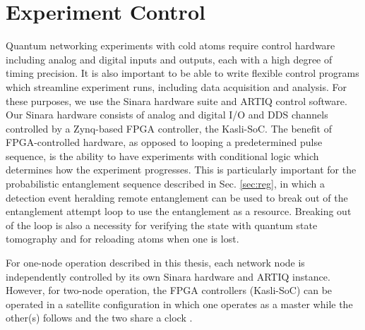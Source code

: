 \section{Experiment Control}

Quantum networking experiments with cold atoms require control hardware including analog and digital inputs and outputs, each with a high degree of timing precision. It is also important to be able to write flexible control programs which streamline experiment runs, including data acquisition and analysis. For these purposes, we use the Sinara hardware suite and ARTIQ control software. Our Sinara hardware consists of analog and digital I/O and DDS channels controlled by a Zynq-based FPGA controller, the Kasli-SoC\cite{lam2021combining}. The benefit of FPGA-controlled hardware, as opposed to looping a predetermined pulse sequence, is the ability to have experiments with conditional logic which determines how the experiment progresses. This is particularly important for the probabilistic entanglement sequence described in Sec. \ref{sec:reg}, in which a detection event heralding remote entanglement can be used to break out of the entanglement attempt loop to use the entanglement as a resource. Breaking out of the loop is also a necessity for verifying the state with quantum state tomography and for reloading atoms when one is lost.

For one-node operation described in this thesis, each network node is independently controlled by its own Sinara hardware and ARTIQ instance. However, for two-node operation, the FPGA controllers (Kasli-SoC) can be operated in a satellite configuration in which one operates as a master while the other(s) follows and the two share a clock \cite{Stephenson2020}. 

